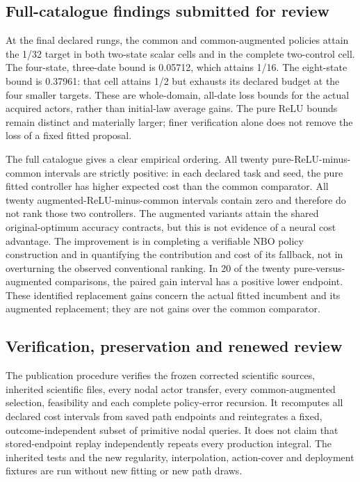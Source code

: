 \documentclass[ecta,nameyear,draft]{econsocart}
\begin{document}
\hypertarget{full-catalogue-findings-submitted-for-review}{%
\subsection{Full-catalogue findings submitted for
review}\label{full-catalogue-findings-submitted-for-review}}

At the final declared rungs, the common and common-augmented policies
attain the 1/32 target in both two-state scalar cells and in the
complete two-control cell. The four-state, three-date bound is 0.05712,
which attains 1/16. The eight-state bound is 0.37961: that cell attains
1/2 but exhausts its declared budget at the four smaller targets. These
are whole-domain, all-date loss bounds for the actual acquired actors,
rather than initial-law average gains. The pure ReLU bounds remain
distinct and materially larger; finer verification alone does not remove
the loss of a fixed fitted proposal.

The full catalogue gives a clear empirical ordering. All twenty
pure-ReLU-minus-common intervals are strictly positive: in each declared
task and seed, the pure fitted controller has higher expected cost than
the common comparator. All twenty augmented-ReLU-minus-common intervals
contain zero and therefore do not rank those two controllers. The
augmented variants attain the shared original-optimum accuracy
contracts, but this is not evidence of a neural cost advantage. The
improvement is in completing a verifiable NBO policy construction and in
quantifying the contribution and cost of its fallback, not in
overturning the observed conventional ranking. In 20 of the twenty
pure-versus-augmented comparisons, the paired gain interval has a
positive lower endpoint. These identified replacement gains concern the
actual fitted incumbent and its augmented replacement; they are not
gains over the common comparator.

\hypertarget{verification-preservation-and-renewed-review}{%
\subsection{Verification, preservation and renewed
review}\label{verification-preservation-and-renewed-review}}

The publication procedure verifies the frozen corrected scientific
sources, inherited scientific files, every nodal actor transfer, every
common-augmented selection, feasibility and each complete policy-error
recursion. It recomputes all declared cost intervals from saved path
endpoints and reintegrates a fixed, outcome-independent subset of
primitive nodal queries. It does not claim that stored-endpoint replay
independently repeats every production integral. The inherited tests and
the new regularity, interpolation, action-cover and deployment fixtures
are run without new fitting or new path draws.
\end{document}
